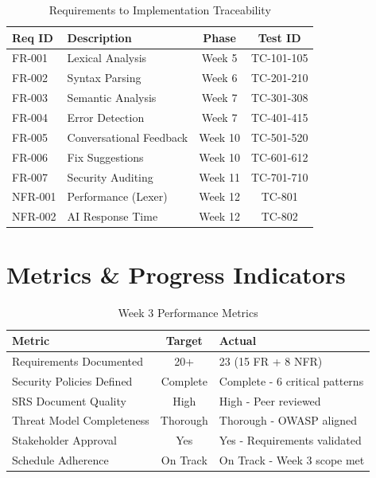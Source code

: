 \documentclass[a4paper,11pt]{article}
\begin{document}
\begin{table}[h]
\centering
\begin{tabularx}{\textwidth}{|l|X|c|c|}
\hline
\rowcolor{blue!10}
\textbf{Req ID} & \textbf{Description} & \textbf{Phase} & \textbf{Test ID} \\
\hline
FR-001 & Lexical Analysis & Week 5 & TC-101-105 \\
\hline
FR-002 & Syntax Parsing & Week 6 & TC-201-210 \\
\hline
FR-003 & Semantic Analysis & Week 7 & TC-301-308 \\
\hline
FR-004 & Error Detection & Week 7 & TC-401-415 \\
\hline
FR-005 & Conversational Feedback & Week 10 & TC-501-520 \\
\hline
FR-006 & Fix Suggestions & Week 10 & TC-601-612 \\
\hline
FR-007 & Security Auditing & Week 11 & TC-701-710 \\
\hline
NFR-001 & Performance (Lexer) & Week 12 & TC-801 \\
\hline
NFR-002 & AI Response Time & Week 12 & TC-802 \\
\hline
\end{tabularx}
\caption{Requirements to Implementation Traceability}
\end{table}

\section{Metrics \& Progress Indicators}

\begin{table}[h]
\centering
\begin{tabularx}{\textwidth}{|l|c|X|}
\hline
\rowcolor{blue!10}
\textbf{Metric} & \textbf{Target} & \textbf{Actual} \\
\hline
Requirements Documented & 20+ & 23 (15 FR + 8 NFR) \\
\hline
Security Policies Defined & Complete & Complete - 6 critical patterns \\
\hline
SRS Document Quality & High & High - Peer reviewed \\
\hline
Threat Model Completeness & Thorough & Thorough - OWASP aligned \\
\hline
Stakeholder Approval & Yes & Yes - Requirements validated \\
\hline
Schedule Adherence & On Track & On Track - Week 3 scope met \\
\hline
\end{tabularx}
\caption{Week 3 Performance Metrics}
\end{table}
\end{document}
